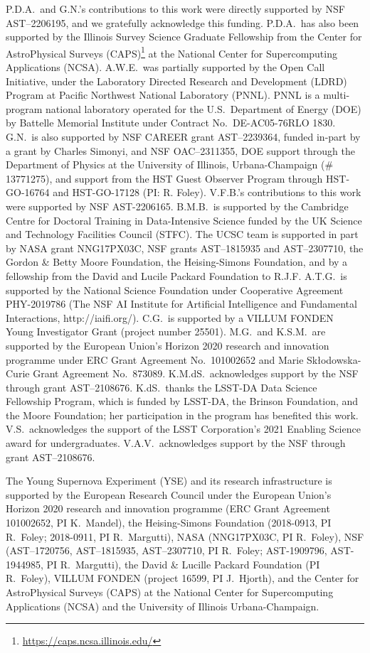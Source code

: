 \documentclass[twocolumn]{aastex63}
\begin{document}

P.D.A.\ and G.N.'s contributions to this work were directly supported by NSF AST--2206195, and we gratefully acknowledge this funding.
P.D.A.\ has also been supported by the Illinois Survey Science Graduate Fellowship from the Center for AstroPhysical Surveys (CAPS)\footnote{\url{https://caps.ncsa.illinois.edu/}} at the National Center for Supercomputing Applications (NCSA).
A.W.E.\ was partially supported by the Open Call Initiative, under the Laboratory Directed Research and Development (LDRD) Program at Pacific Northwest National Laboratory (PNNL). PNNL is a multi-program national laboratory operated for the U.S.\ Department of Energy (DOE) by Battelle Memorial Institute under Contract No.\ DE-AC05-76RLO 1830.
G.N.\ is also supported by NSF CAREER grant AST--2239364, funded in-part by a grant by Charles Simonyi, and NSF OAC--2311355, DOE support through the Department of Physics at the University of Illinois, Urbana-Champaign (\# 13771275), and support from the HST Guest Observer Program through HST-GO-16764 and HST-GO-17128 (PI: R. Foley).
V.F.B.'s contributions to this work were supported by NSF AST-2206165.
B.M.B.\ is supported by the Cambridge Centre for Doctoral Training in Data-Intensive Science funded by the UK Science and Technology Facilities Council (STFC).
The UCSC team is supported in part by NASA grant NNG17PX03C, NSF grants AST--1815935 and AST--2307710, the Gordon \& Betty Moore Foundation, the Heising-Simons Foundation, and by a fellowship from the David and Lucile Packard Foundation to R.J.F.
A.T.G.\ is supported by the National Science Foundation under Cooperative Agreement PHY-2019786 (The NSF AI Institute for Artificial Intelligence and Fundamental Interactions, http://iaifi.org/).
C.G.\ is supported by a VILLUM FONDEN Young Investigator Grant (project number 25501).
M.G.\ and K.S.M.\ are supported by the European Union’s Horizon 2020 research and innovation programme under ERC Grant Agreement No.\ 101002652 and Marie Sk\l{}odowska-Curie Grant Agreement No.\ 873089.
K.M.dS.\ acknowledges support by the NSF through grant AST--2108676. K.dS.\ thanks the LSST-DA Data Science Fellowship Program, which is funded by LSST-DA, the Brinson Foundation, and the Moore Foundation; her participation in the program has benefited this work. 
V.S.\ acknowledges the support of the LSST Corporation's 2021 Enabling Science award for undergraduates.
V.A.V.\ acknowledges support by the NSF through grant AST--2108676.


The Young Supernova Experiment (YSE) and its research infrastructure is supported by the European Research Council under the European Union's Horizon 2020 research and innovation programme (ERC Grant Agreement 101002652, PI K.\ Mandel), the Heising-Simons Foundation (2018-0913, PI R.\ Foley; 2018-0911, PI R.\ Margutti), NASA (NNG17PX03C, PI R.\ Foley), NSF (AST--1720756, AST--1815935, AST--2307710, PI R.\ Foley; AST-1909796, AST-1944985, PI R.\ Margutti), the David \& Lucille Packard Foundation (PI R.\ Foley), VILLUM FONDEN (project 16599, PI J.\ Hjorth), and the Center for AstroPhysical Surveys (CAPS) at the National Center for Supercomputing Applications (NCSA) and the University of Illinois Urbana-Champaign.
\end{document}
